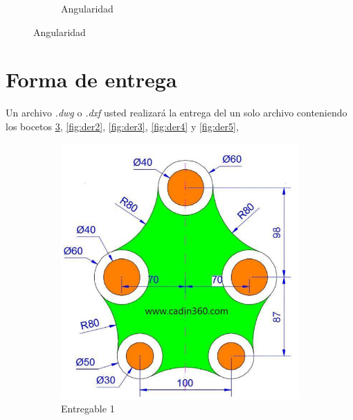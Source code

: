 \documentclass[letterpaper,pdftex]{article}
\begin{document}
\begin{figure}[h]
\begin{subfigure}[b]{0.45\textwidth}
         \caption{Angularidad}
         \label{fig:simple4}
     \end{subfigure}
\end{figure}

\section{Forma de entrega}

Un archivo \textit{.dwg} o \textit{.dxf} usted realizará la entrega del un solo archivo conteniendo los bocetos \ref{fig:der1}, \ref{fig:der2}, \ref{fig:der3}, \ref{fig:der4} y \ref{fig:der5}, 


\begin{figure}[h]
     \centering
     \begin{subfigure}[b]{0.45\textwidth}
         \centering
         \includegraphics[width=\textwidth]{task1}
         \caption{Entregable 1}
         \label{fig:der1}
     \end{subfigure}
     \hfill
     \begin{subfigure}[b]{0.45\textwidth}
         \centering

\end{subfigure}
\end{figure}
\end{document}
